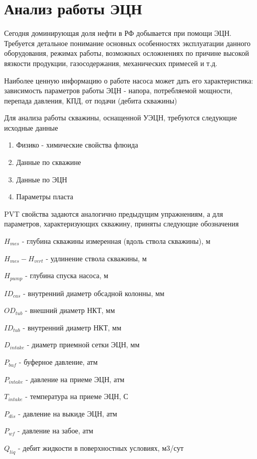 \section{Анализ работы ЭЦН}

Сегодня доминирующая доля нефти в РФ добывается при помощи ЭЦН. Требуется детальное понимание основных особенностях эксплуатации данного оборудования, режимах работы, возможных осложнениях по причине высокой вязкости продукции, газосодержания, механических примесей и т.д.

Наиболее ценную информацию о работе насоса может дать его характеристика: зависимость параметров работы ЭЦН - напора, потребляемой мощности, перепада давления, КПД, от подачи (дебита скважины)

Для анализа работы скважины, оснащенной УЭЦН, требуются следующие исходные данные

\begin{enumerate}
	\item Физико - химические свойства флюида
	\item Данные по скважине
	\item Данные по ЭЦН
	\item Параметры пласта
\end{enumerate}

PVT свойства задаются аналогично предыдущим упражнениям, а для параметров, характеризующих скважину, приняты следующие обозначения

$H_{mes}$ - глубина скважины измеренная (вдоль ствола скважины), м

$H_{mes}- H_{vert}$ - удлинение ствола скважины, м

$H_{pump}$ - глубина спуска насоса, м

$ID_{cas}$ - внутренний диаметр обсадной колонны, мм

$OD_{tub}$ - внешний диаметр НКТ, мм

$ID_{tub}$ - внутренний диаметр НКТ, мм

$D_{intake}$ - диаметр приемной сетки ЭЦН, мм

$P_{buf}$ - буферное давление, атм

$P_{intake}$ - давление на приеме ЭЦН, атм

$T_{intake}$ - температура на приеме ЭЦН, С

$P_{dis}$ - давление на выкиде ЭЦН, атм

$P_{wf}$ - давление на забое, атм

$Q_{liq}$ - дебит жидкости в поверхностных условиях, м3/сут

